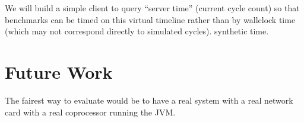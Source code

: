 \documentclass[10pt]{article}
\begin{document}
\begin{itemize}
  We will build a simple
  client to query ``server time'' (current cycle count) so that
  benchmarks can be timed on this virtual timeline rather than by
  wallclock time (which may not correspond directly to simulated
  cycles). synthetic time.








\section{Future Work}
The fairest way to evaluate would be to have a real system with a real network card
with a real coprocessor running the JVM.


\end{itemize}
\end{document}
